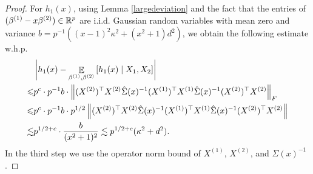 \begin{proof}
For $h_1(x)$, using Lemma \ref{largedeviation} and the fact that the entries of $(\beta^{(1)}-x\beta^{(2)})\in \mathbb{R}^p$ are i.i.d. Gaussian random variables with mean zero and variance $b = p^{-1}((x-1)^2\kappa^2 + (x^2+1)d^2)$, we obtain the following estimate w.h.p.
\begin{align}
	&\left|h_1(x) - \mathop{\mathbb{E}}_{\beta^{(1)},\beta^{(2)}}\left[ h_1(x) \mid X_1, X_2 \right]\right|\nonumber \\
\leqslant& p^{c}\cdot p^{-1} b \cdot \left\| (X^{(2)})^\top X^{(2)}  \hat\Sigma(x)^{-1}  (X^{(1)})^\top X^{(1)} \hat\Sigma(x)^{-1} (X^{(2)})^\top X^{(2)} \right\|_F \nonumber\\
	\leqslant& p^{c}\cdot p^{-1} b \cdot p^{1/2} \left\| (X^{(2)})^\top X^{(2)}  \hat\Sigma(x)^{-1}  (X^{(1)})^\top X^{(1)} \hat\Sigma(x)^{-1} (X^{(2)})^\top X^{(2)} \right\| \nonumber \\
	\lesssim& p^{1/2+c}\cdot \frac{b}{(x^2+1)^2}\lesssim p^{1/2+c}(\kappa^2 + d^2).\label{eq_hA1}
\end{align}
In the third step we use the operator norm bound of $X^{(1)}$, $X^{(2)}$, and $\hat{\Sigma}(x)^{-1}$. %


\end{proof}
